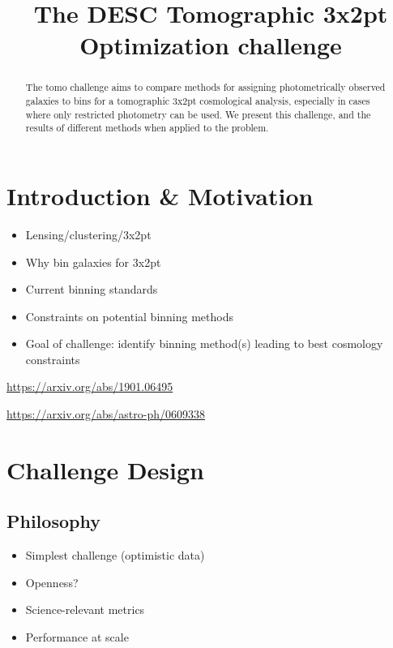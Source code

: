 \documentclass[twocolumn,twocolappendix]{aastex63}
\begin{document}
\title{The DESC Tomographic 3x2pt Optimization challenge}


\begin{abstract}
The tomo challenge aims to compare methods for assigning photometrically observed galaxies to bins for a tomographic 3x2pt cosmological analysis, especially in cases where only restricted photometry can be used.
We present this challenge, and the results of different methods when applied to the problem.
\end{abstract}





\section{Introduction \& Motivation}

\begin{itemize}
    \item Lensing/clustering/3x2pt 
    \item Why bin galaxies for 3x2pt
    \item Current binning standards
    \item Constraints on potential binning methods
    \item Goal of challenge: identify binning method(s) leading to best cosmology constraints 
\end{itemize}

\url{https://arxiv.org/abs/1901.06495}

\url{https://arxiv.org/abs/astro-ph/0609338}

\section{Challenge Design}

\subsection{Philosophy}
\begin{itemize}
    \item Simplest challenge (optimistic data)
    \item Openness?
    \item Science-relevant metrics
    \item Performance at scale
\end{itemize}
\end{document}
